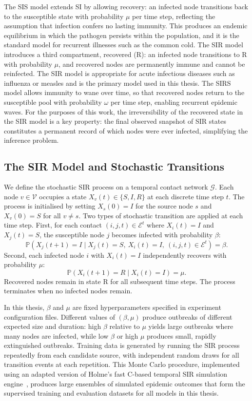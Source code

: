 The SIS model extends SI by allowing recovery: an infected node transitions back to the susceptible state with probability $\mu$ per time step, reflecting the assumption that infection confers no lasting immunity. This produces an endemic equilibrium in which the pathogen persists within the population, and it is the standard model for recurrent illnesses such as the common cold. The SIR model introduces a third compartment, recovered (R): an infected node transitions to R with probability $\mu$, and recovered nodes are permanently immune and cannot be reinfected. The SIR model is appropriate for acute infectious diseases such as influenza or measles and is the primary model used in this thesis. The SIRS model allows immunity to wane over time, so that recovered nodes return to the susceptible pool with probability $\omega$ per time step, enabling recurrent epidemic waves. For the purposes of this work, the irreversibility of the recovered state in the SIR model is a key property: the final observed snapshot of SIR states constitutes a permanent record of which nodes were ever infected, simplifying the inference problem.

\subsection{The SIR Model and Stochastic Transitions}

We define the stochastic SIR process on a temporal contact network $\mathcal{G}$. Each node $v \in \mathcal{V}$ occupies a state $X_v(t) \in \{S, I, R\}$ at each discrete time step $t$. The process is initialised by setting $X_s(0) = I$ for the source node $s$ and $X_v(0) = S$ for all $v \neq s$. Two types of stochastic transition are applied at each time step. First, for each contact $(i, j, t) \in \mathcal{E}^t$ where $X_i(t) = I$ and $X_j(t) = S$, the susceptible node $j$ becomes infected with probability $\beta$:
\[
    \mathbb{P}\!\left(X_j(t+1) = I \mid X_j(t) = S,\ X_i(t) = I,\ (i,j,t) \in \mathcal{E}^t\right) = \beta.
\]
Second, each infected node $i$ with $X_i(t) = I$ independently recovers with probability $\mu$:
\[
    \mathbb{P}\!\left(X_i(t+1) = R \mid X_i(t) = I\right) = \mu.
\]
Recovered nodes remain in state R for all subsequent time steps. The process terminates when no infected nodes remain.

In this thesis, $\beta$ and $\mu$ are fixed hyperparameters specified in experiment configuration files. Different values of $(\beta, \mu)$ produce outbreaks of different expected size and duration: high $\beta$ relative to $\mu$ yields large outbreaks where many nodes are infected, while low $\beta$ or high $\mu$ produces small, rapidly extinguished outbreaks. Training data is generated by running the SIR process repeatedly from each candidate source, with independent random draws for all transition events at each repetition. This Monte Carlo procedure, implemented using an adapted version of Holme's fast C-based temporal SIR simulation engine~\cite{Holme2020}, produces large ensembles of simulated epidemic outcomes that form the supervised training and evaluation datasets for all models in this thesis.

